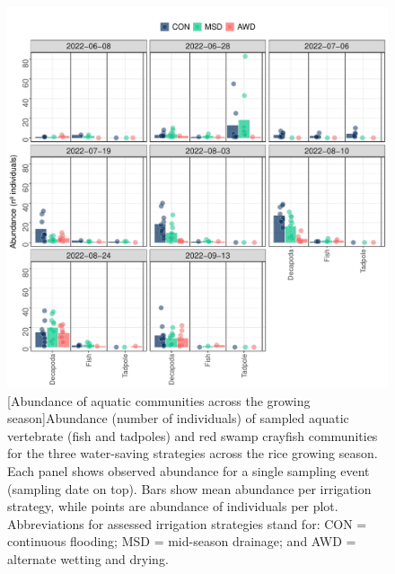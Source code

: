 
\begin{figure}[htbp]
\captionsetup{justification=justified}
	\centering 
	\includegraphics[scale=0.6, center]{Figures/Chapter_1/Abu.div_2022_avg_plots.perDate.pdf}
	[Abundance of aquatic communities across the growing season]{Abundance (number of individuals) of sampled aquatic vertebrate (fish and tadpoles) and red swamp crayfish communities for the three water-saving strategies across the rice growing season. Each panel shows observed abundance for a single sampling event (sampling date on top). Bars show mean abundance per irrigation strategy, while points are abundance of individuals per plot. Abbreviations for assessed irrigation strategies stand for: CON = continuous flooding; MSD = mid-season drainage; and AWD = alternate wetting and drying.}   
	\label{Abu_date}
\end{figure}

\renewcommand{\thefigure}{\thechapter.\arabic{figure}}
\setcounter{figure}{0}

\renewcommand{\thetable}{\thechapter.\arabic{table}}
\setcounter{table}{0}



